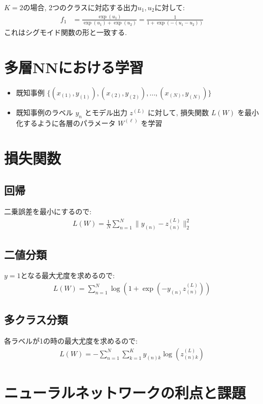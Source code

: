 \documentclass[dvipdfmx, 10pt]{jsarticle}
\begin{document}
$K = 2$の場合, 2つのクラスに対応する出力$u_1, u_2$に対して: 
\begin{align*}
    f_1 &= \frac{\exp(u_1)}{\exp(u_1) + \exp(u_2)} = \frac{1}{1 + \exp(-(u_1 - u_2))}
\end{align*}
これはシグモイド関数の形と一致する. 

\section*{多層NNにおける学習}
\begin{itemize}
    \item 既知事例 $\{(x_{(1)}, y_{(1)}), (x_{(2)}, y_{(2)}), \ldots, (x_{(N)}, y_{(N)})\}$
    \item 既知事例のラベル $y_n$ とモデル出力 $z^{(L)}$ に対して, 損失関数 $L(W)$ を最小化するように各層のパラメータ $W^{(\ell)}$ を学習
\end{itemize}

\section*{損失関数}
\subsection*{回帰}
二乗誤差を最小にするので: 
\begin{align*}
    L(W) = \frac{1}{N} \sum_{n=1}^N \| y_{(n)} - z^{(L)}_{(n)} \|_2^2
\end{align*}

\subsection*{二値分類}
$y=1$となる最大尤度を求めるので: 
\begin{align*}
    L(W) = \sum_{n=1}^N \log(1 + \exp(-y_{(n)} z^{(L)}_{(n)}))
\end{align*}

\subsection*{多クラス分類}
各ラベルが1の時の最大尤度を求めるので: 
\begin{align*}
    L(W) = -\sum_{n=1}^N \sum_{k=1}^K y_{(n)k} \log(z^{(L)}_{(n)k})
\end{align*}

\section*{ニューラルネットワークの利点と課題}
\end{document}
